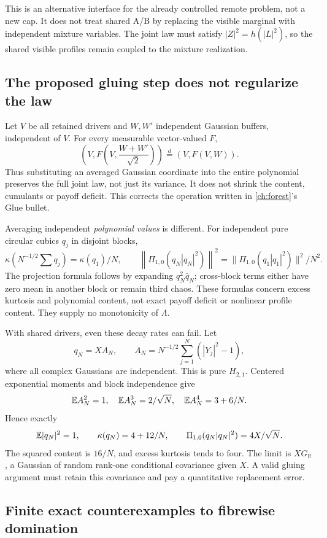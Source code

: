 This is an alternative interface for the already controlled remote
problem, not a new cap. It does not treat shared A/B by replacing
the visible marginal with independent mixture variables. The joint
law must satisfy \(|Z|^2=h(|L|^2)\), so the shared visible profiles
remain coupled to the mixture realization.

\subsection{The proposed gluing step does not regularize the law}
\label{avg:glue}

Let \(V\) be all retained drivers and \(W,W'\) independent Gaussian
buffers, independent of \(V\). For every measurable vector-valued \(F\),
\[
\left(V,F\left(V,\frac{W+W'}{\sqrt2}\right)\right)
\stackrel d=(V,F(V,W)).
\]
Thus substituting an averaged Gaussian coordinate into the entire
polynomial preserves the full joint law, not just its variance.
It does not shrink the content, cumulants or payoff deficit.
This corrects the operation written in \autoref{ch:forest}'s Glue bullet.

Averaging independent \emph{polynomial values} is different. For
independent pure circular cubics \(q_j\) in disjoint blocks,
\[
\kappa\left(N^{-1/2}\sum q_j\right)=\kappa(q_1)/N,\qquad
\left\|\Pi_{1,0}\left(q_N|q_N|^2\right)\right\|^2
=\|\Pi_{1,0}(q_1|q_1|^2)\|^2/N^2.
\]
The projection formula follows by expanding \(q_N^2\bar q_N\);
cross-block terms either have zero mean in another block or remain
third chaos. These formulas concern excess kurtosis and polynomial
content, not exact payoff deficit or nonlinear profile content.
They supply no monotonicity of \(\Lambda\).

With shared drivers, even these decay rates can fail. Let
\[
q_N=X A_N,\qquad
A_N=N^{-1/2}\sum_{j=1}^N(|Y_j|^2-1),
\]
where all complex Gaussians are independent. This is pure \(H_{2,1}\).
Centered exponential moments and block independence give
\[
\mathbb E A_N^2=1,\quad \mathbb E A_N^3=2/\sqrt N,\quad
\mathbb E A_N^4=3+6/N.
\]
Hence exactly
\[
\mathbb E|q_N|^2=1,\qquad \kappa(q_N)=4+12/N,\qquad
\Pi_{1,0}(q_N|q_N|^2)=4X/\sqrt N.
\]
The squared content is \(16/N\), and excess kurtosis tends to four.
The limit is \(XG_{\mathbb R}\), a Gaussian of random rank-one
conditional covariance given \(X\). A valid gluing argument must
retain this covariance and pay a quantitative replacement error.

\subsection{Finite exact counterexamples to fibrewise domination}

